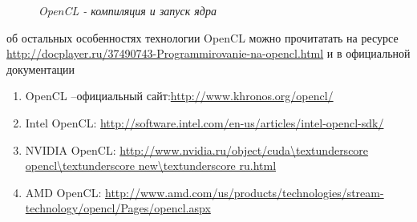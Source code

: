 {\begin{figure}[H]
		\caption{\textit{OpenCL - компиляция и запуск ядра}}
		\label{OpenCLKernelExample:image}
	\end{figure}
	 об остальных особенностях технологии OpenCL можно прочитатать на ресурсе \url{http://docplayer.ru/37490743-Programmirovanie-na-opencl.html} и в официальной документации
	\begin{enumerate}
		\sloppy
		\item OpenCL –официальный сайт:\url{http://www.khronos.org/opencl/}
		\item Intel OpenCL: \url{http://software.intel.com/en-us/articles/intel-opencl-sdk/}
		\item NVIDIA OpenCL: \url{http://www.nvidia.ru/object/cuda\textunderscore opencl\textunderscore new\textunderscore ru.html}
		\item AMD OpenCL: \url{http://www.amd.com/us/products/technologies/stream-technology/opencl/Pages/opencl.aspx}
	\end{enumerate}
}